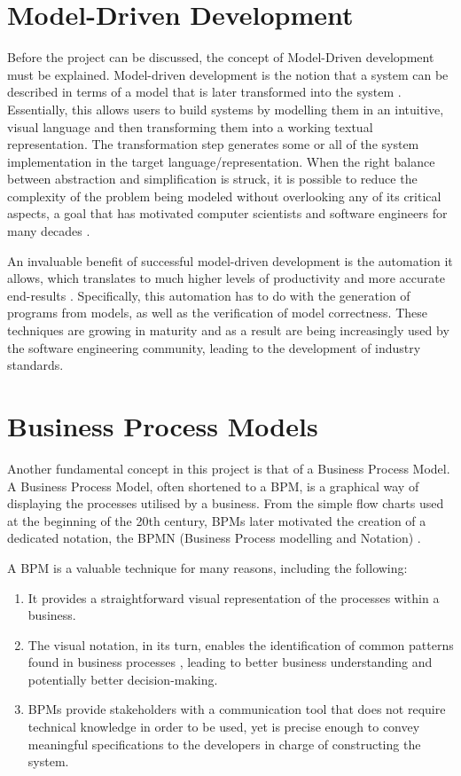 \documentclass[11pt, a4paper, oneside, openright]{article}
\begin{document}
\section{Model-Driven Development}

Before the project can be discussed, the concept of Model-Driven development
must be explained. Model-driven development is the notion that a system can be
described in terms of a model that is later transformed into the system
\cite{mdd}.
Essentially, this allows users to build systems by modelling them in an
intuitive, visual language and then transforming them into a working textual
representation. The transformation step generates some or all of the system
implementation in the target language/representation. When the right balance
between abstraction and simplification is struck, it is possible to reduce the
complexity of the problem being modeled without overlooking any of its critical
aspects, a goal that has motivated computer scientists and software engineers
for many decades \cite{goodBadUgly}.

An invaluable benefit of successful model-driven development is the
automation it allows, which translates to much higher levels of productivity
and more accurate end-results \cite{mddPragmatics}. Specifically, this automation has to do
with the generation of programs from models, as well as the verification of
model correctness. These techniques are growing in maturity and as a result
are being increasingly used by the software engineering community, leading
to the development of industry standards.

\section{Business Process Models}

Another fundamental concept in this project is that of a Business Process Model.
A Business Process Model, often shortened to a BPM, is a graphical way of
displaying the processes utilised by a business. From the simple flow charts
used at the beginning of the 20th century, BPMs later motivated the creation of
a dedicated notation, the BPMN (Business Process modelling and Notation) \cite{bpmSim}.

A BPM is a valuable technique for many reasons, including the following:

\begin{enumerate}
  \item It provides a straightforward visual representation of the processes
  within a business.
  \item The visual notation, in its turn, enables the identification of common
  patterns found in business processes \cite{bpmImp}, leading to better business
  understanding and potentially better decision-making.
  \item BPMs provide stakeholders with a communication tool that does not
  require technical knowledge in order to be used, yet is precise enough to
  convey meaningful specifications to the developers in charge of constructing
  the system.
\end{enumerate}
\end{document}
